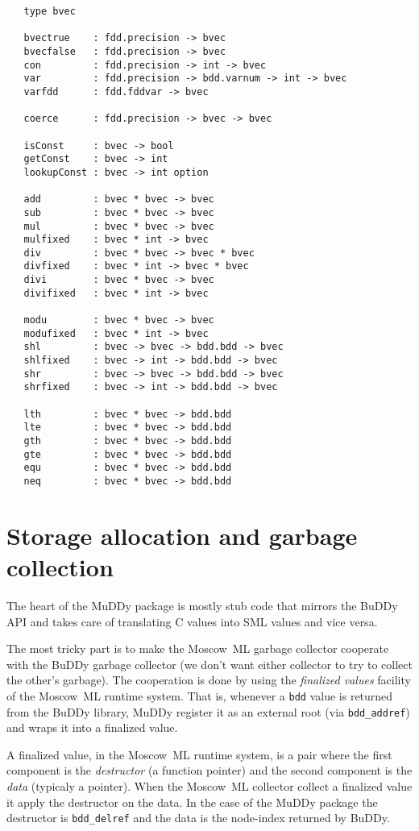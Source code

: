 \documentclass[12pt]{article}
\newcommand{\mosml}{Moscow~ML\xspace}
\newcommand{\Buddy}{BuDDy\xspace}
\newcommand{\Muddy}{MuDDy\xspace}
\begin{document}
{\tiny
\begin{verbatim}
   type bvec

   bvectrue    : fdd.precision -> bvec 
   bvecfalse   : fdd.precision -> bvec 
   con         : fdd.precision -> int -> bvec
   var         : fdd.precision -> bdd.varnum -> int -> bvec
   varfdd      : fdd.fddvar -> bvec

   coerce      : fdd.precision -> bvec -> bvec

   isConst     : bvec -> bool
   getConst    : bvec -> int
   lookupConst : bvec -> int option

   add         : bvec * bvec -> bvec
   sub         : bvec * bvec -> bvec
   mul         : bvec * bvec -> bvec
   mulfixed    : bvec * int -> bvec
   div         : bvec * bvec -> bvec * bvec
   divfixed    : bvec * int -> bvec * bvec
   divi        : bvec * bvec -> bvec
   divifixed   : bvec * int -> bvec

   modu        : bvec * bvec -> bvec
   modufixed   : bvec * int -> bvec
   shl         : bvec -> bvec -> bdd.bdd -> bvec
   shlfixed    : bvec -> int -> bdd.bdd -> bvec
   shr         : bvec -> bvec -> bdd.bdd -> bvec
   shrfixed    : bvec -> int -> bdd.bdd -> bvec

   lth         : bvec * bvec -> bdd.bdd
   lte         : bvec * bvec -> bdd.bdd
   gth         : bvec * bvec -> bdd.bdd
   gte         : bvec * bvec -> bdd.bdd
   equ         : bvec * bvec -> bdd.bdd
   neq         : bvec * bvec -> bdd.bdd
\end{verbatim}}

\section{Storage allocation and garbage collection}
\label{sec:technical-details}

The heart of the \Muddy package is mostly stub code that mirrors the
\Buddy API and takes care of translating C values into SML values and
vice versa.

The most tricky part is to make the \mosml garbage collector cooperate
with the \Buddy garbage collector (we don't want either collector to
try to collect the other's garbage).  The cooperation is done by using
the \emph{finalized values} facility of the \mosml runtime system.
That is, whenever a \texttt{bdd} value is returned from the \Buddy
library, \Muddy register it as an external root (via
\verb+bdd_addref+) and wraps it into a finalized value.  

A finalized value, in the \mosml runtime system, is a pair where the
first component is the \emph{destructor} (a function pointer) and the
second component is the \emph{data} (typicaly a pointer).  When the
\mosml collector collect a finalized value it apply the destructor on
the data.  In the case of the \Muddy package the destructor is
\verb+bdd_delref+ and the data is the node-index returned by \Buddy.
\end{document}
